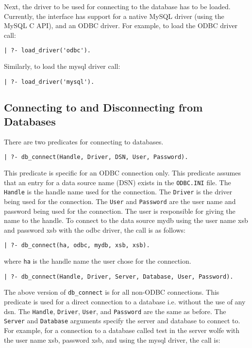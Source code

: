 Next, the driver to be used for connecting to the database has to 
be loaded. Currently, the interface has support for a native MySQL driver
(using the MySQL C API), and an ODBC driver. For example, to load 
the ODBC driver call:

\begin{verbatim}
| ?- load_driver('odbc').
\end{verbatim}

Similarly, to load the mysql driver call:

\begin{verbatim}
| ?- load_driver('mysql').
\end{verbatim}

\subsection{Connecting to and Disconnecting from Databases}

There are two predicates for connecting to databases. 

\begin{verbatim}
| ?- db_connect(Handle, Driver, DSN, User, Password).
\end{verbatim}

This predicate is specific for an ODBC connection only.
This predicate assumes that an entry for a data source name (DSN) exists
in the {\tt ODBC.INI} file. The {\tt Handle} is the handle name used for 
the connection. The {\tt Driver} is the driver being used for the 
connection.
The {\tt User} and {\tt Password} are the user name and password 
being used for the connection. The user is responsible for giving 
the name to the handle.
To connect to the data source mydb using the user name xsb and password xsb
with the odbc driver, the call is as follows: 

\begin{verbatim}
| ?- db_connect(ha, odbc, mydb, xsb, xsb).
\end{verbatim}

where {\tt ha} is the handle name the user chose for the connection.

\begin{verbatim}
| ?- db_connect(Handle, Driver, Server, Database, User, Password).
\end{verbatim}

The above version of {\tt db\_connect} is for all non-ODBC connections.
This predicate is used for a direct connection to a database i.e.
without the use of any dsn. The {\tt Handle}, {\tt Driver}, {\tt User},
and {\tt Password} are the same as before. The {\tt Server} and 
{\tt Database} arguments specify the server and database to connect to.
For example, for a connection to a database called test in the server
wolfe with the user name xsb, password xsb, and using the mysql
driver, the call is:

